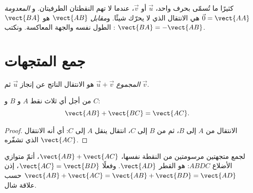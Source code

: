 \begin{notation}
كثيرًا ما تُسمّى  بحرف واحد، $\vec u$ أو $\vec v$، عندما لا
تهم النقطتان الطرفيتان. و\emph{ المعدومة} $\vec 0 = \vect{AA}$ هي
الانتقال الذي لا يحرّك شيئًا. و\emph{مقابل} 
$\vect{AB}$ هو $\vect{BA}$: الطول نفسه والجهة المعاكسة. ونكتب
$\vect{BA} = -\vect{AB}$.
\end{notation}

\section{جمع المتجهات}

\begin{definition}\label{def:g10:vectors:sum}
\emph{المجموع} $\vec u + \vec v$ هو الانتقال
الناتج عن إنجاز $\vec u$ ثم $\vec v$.
\end{definition}

\begin{theorem}\label{thm:g10:vectors:chasles}
من أجل أي ثلاث نقط $A$ و $B$ و $C$:
\[
\vect{AB} + \vect{BC} = \vect{AC}.
\]
\end{theorem}

\begin{proof}
الانتقال من $A$ إلى $B$، ثم من $B$ إلى $C$، انتقال ينقل
$A$ إلى $C$: أي أنه الانتقال الذي تشفّره $\vect{AC}$.
\end{proof}

\begin{remark}
لجمع متجهتين مرسومتين من النقطة نفسها، $\vect{AB} + \vect{AC}$،
أتمّ متوازي الأضلاع $ABDC$:  هو القطر $\vect{AD}$.
وفعلًا $\vect{AC} = \vect{BD}$، إذن
$\vect{AB} + \vect{AC} = \vect{AB} + \vect{BD} = \vect{AD}$ حسب علاقة
شال.
\end{remark}


